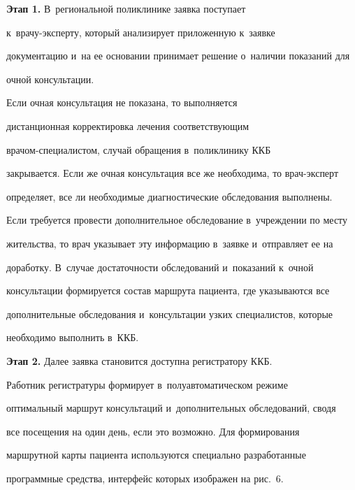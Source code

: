   


  \textbf{Этап 1.} В~региональной поликлинике заявка поступает 


  к~вра\-чу-экс\-пер\-ту, который анализирует приложенную к~заявке 


документацию и~на ее основании принимает решение о~наличии показаний для 


очной консультации. 





Если очная консультация не показана, то выполняется 


дистанционная корректировка лечения соответствующим  


вра\-чом-спе\-ци\-а\-ли\-стом, случай обращения в~поликлинику ККБ 


закрывается. Если же очная консультация все же необходима, то врач-экс\-перт 


определяет, все ли необходимые диагностические обследования выполнены. 


Если требуется провести дополнительное обследование в~учреждении по месту 


жительства, то врач указывает эту информацию в~заявке и~отправляет ее на 


доработку. В~случае достаточности обследований и~показаний к~очной 


консультации формируется состав маршрута пациента, где указываются все 


дополнительные обследования и~консультации узких специалистов, которые 


необходимо выполнить в~ККБ.


  


  \textbf{Этап 2.} Далее заявка становится доступна регистратору ККБ. 


Работник регистратуры формирует в~полуавтоматическом режиме 


оптимальный маршрут консультаций и~дополнительных обследований, сводя 


все посещения на один день, если это возможно. Для формирования 


маршрутной карты пациента используются специально разработанные 


программные средства, интерфейс которых изображен на рис.~6.





